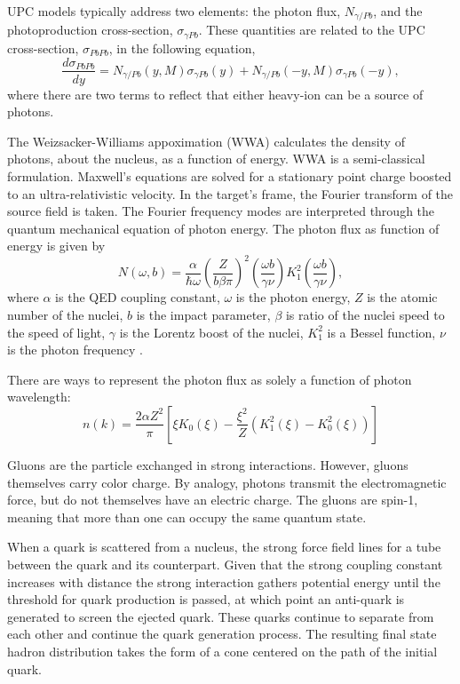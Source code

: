 UPC models typically address two elements: the photon flux, $N_{\gamma / Pb}$, and the photoproduction cross-section, $\sigma_{\gamma Pb}$. These quantities are related to the UPC cross-section, $\sigma_{PbPb}$, in the following equation,
\begin{equation}
\frac{d \sigma_{PbPb}}{dy} = N_{\gamma/Pb}(y,M)\sigma_{\gamma Pb}(y)+N_{\gamma/Pb}(-y,M)\sigma_{\gamma Pb}(-y),
\end{equation}
where there are two terms to reflect that either heavy-ion can be a source of photons. 

The Weizsacker-Williams appoximation (WWA) calculates the density of photons, about the nucleus, as a function of energy. WWA is a semi-classical formulation. Maxwell's equations are solved for a stationary point charge boosted to an ultra-relativistic velocity. In the target's frame, the Fourier transform of the source field is taken. The Fourier frequency modes are interpreted through the quantum mechanical equation of photon energy. The photon flux as function of energy is given by
\begin{equation}
N(\omega,b) = \frac{\alpha}{\hbar \omega}\left( \frac{Z}{b\beta\pi} \right)^2\left ( \frac{\omega b}{\gamma \nu} \right )K_1^2\left ( \frac{\omega b}{\gamma \nu} \right ) ,
\end{equation}
where $\alpha$ is the QED coupling constant, $\omega$ is the photon energy, $Z$ is the atomic number of the nuclei, $b$ is the impact parameter, $\beta$ is ratio of the nuclei speed to the speed of light, $\gamma$ is the Lorentz boost of the nuclei, $K_1^2$ is a Bessel function, $\nu$ is the photon frequency \cite{WWJackson}.

There are ways to represent the photon flux as solely a function of photon wavelength:
\begin{equation}
n(k) = \frac{2 \alpha Z^2}{\pi}\left [ \xi K_0(\xi) - \frac{\xi^2}{Z}(K_1^2(\xi)-K_0^2(\xi)) \right ]
\end{equation}

Gluons are the particle exchanged in strong interactions. However, gluons themselves carry color charge. By analogy, photons transmit the electromagnetic force, but do not themselves have an electric charge. The gluons are spin-1, meaning that more than one can occupy the same quantum state.

When a quark is scattered from a nucleus, the strong force field lines for a tube between the quark and its counterpart. Given that the strong coupling constant increases with distance the strong interaction gathers potential energy until the threshold for quark production is passed, at which point an anti-quark is generated to screen the ejected quark. These quarks continue to separate from each other and continue the quark generation process. The resulting final state hadron distribution takes the form of a cone centered on the path of the initial quark. 

